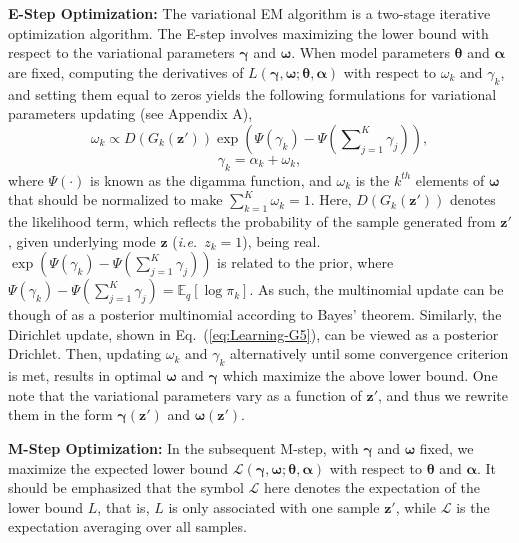 \documentclass{article}
\def\ie{\emph{i.e.}}
\begin{document}
\noindent\textbf{E-Step Optimization:}
The variational EM algorithm is a two-stage iterative optimization algorithm.
The E-step involves maximizing the lower bound with respect to the variational parameters $\bm{\gamma}$ and $\bm{\omega}$.
When model parameters $\bm{\theta}$ and $\bm{\alpha}$ are fixed, computing the derivatives of $L\left( \bm{\gamma},\bm{\omega};\bm{\theta},\bm{\alpha} \right)$ with respect to $\omega_k$ and $\gamma_k$, and setting them equal to zeros yields the following formulations for variational parameters updating (see Appendix A),
\begin{equation}
\label{eq:Learning-G4}
\omega_k\propto
D\left( G_k\left( \mathbf{z}'\right) \right)\exp\left( \Psi\left(\gamma_k\right) - \Psi \left( \sum\nolimits_{j=1}^K \gamma_j\right) \right),
\end{equation}
\begin{equation}
\label{eq:Learning-G5}
\gamma_k
=
\alpha_k
+
\omega_k,
\end{equation}
where $\Psi\left(\cdot\right)$ is known as the digamma function, and $\omega_k$ is the $k^{th}$ elements of $\bm{\omega}$ that should be normalized to make $\sum_{k=1}^K\omega_k=1$.
Here, $D\left(G_k\left(\mathbf{z}'\right)\right)$ denotes the likelihood term, which reflects the probability of the sample generated from $\mathbf{z}'$, given underlying mode $\mathbf{z}$ (\ie~$z_k=1$), being real.
$\exp\left( \Psi\left(\gamma_k\right) - \Psi \left( \sum\nolimits_{j=1}^K \gamma_j\right)\right)$ is related to the prior, where $\Psi\left(\gamma_k\right) - \Psi \left( \sum\nolimits_{j=1}^K \gamma_j \right) = \mathbb{E}_q\left[\log \pi_k \right]$.
As such, the multinomial update can be though of as a posterior multinomial according to Bayes' theorem.
Similarly, the Dirichlet update, shown in Eq.~(\ref{eq:Learning-G5}), can be viewed as a posterior Drichlet.
Then, updating $\omega_k$ and $\gamma_k$ alternatively until some convergence criterion is met,
results in optimal $\bm{\omega}$ and $\bm{\gamma}$ which maximize the above lower bound.
One note that the variational parameters vary as a function of $\mathbf{z}'$, and thus we rewrite them in the form $\bm{\gamma}\left(\mathbf{z}'\right)$ and $\bm{\omega}\left(\mathbf{z}'\right)$.



\noindent\textbf{M-Step Optimization:} In the subsequent M-step, with $\bm{\gamma}$ and $\bm{\omega}$ fixed, we maximize the expected lower bound $\mathcal{L}\left( \bm{\gamma},\bm{\omega};\bm{\theta},\bm{\alpha} \right)$ with respect to $\bm{\theta}$ and $\bm{\alpha}$.
It should be emphasized that the symbol $\mathcal{L}$ here denotes the expectation of the lower bound $L$, that is, $L$ is only associated with one sample $\mathbf{z}'$, while $\mathcal{L}$ is the expectation averaging over all samples.
\end{document}
